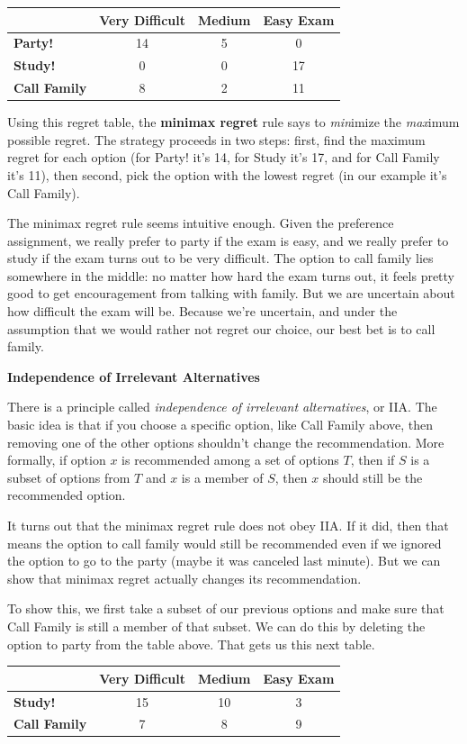 \documentclass[]{tufte-book}
\begin{document}
\begin{longtable}[]{@{}lccc@{}}
\toprule
& Very Difficult & Medium & Easy Exam\tabularnewline
\midrule
\endhead
\textbf{Party!} & 14 & 5 & 0\tabularnewline
\textbf{Study!} & 0 & 0 & 17\tabularnewline
\textbf{Call Family} & 8 & 2 & 11\tabularnewline
\bottomrule
\end{longtable}

Using this regret table, the \textbf{minimax regret} rule says to \emph{min}imize the \emph{max}imum possible regret. The strategy proceeds in two steps: first, find the maximum regret for each option (for Party! it's 14, for Study it's 17, and for Call Family it's 11), then second, pick the option with the lowest regret (in our example it's Call Family).

The minimax regret rule seems intuitive enough. Given the preference assignment, we really prefer to party if the exam is easy, and we really prefer to study if the exam turns out to be very difficult. The option to call family lies somewhere in the middle: no matter how hard the exam turns out, it feels pretty good to get encouragement from talking with family. But we are uncertain about how difficult the exam will be. Because we're uncertain, and under the assumption that we would rather not regret our choice, our best bet is to call family.

\textbf{Independence of Irrelevant Alternatives}

There is a principle called \emph{independence of irrelevant alternatives}, or IIA. The basic idea is that if you choose a specific option, like Call Family above, then removing one of the other options shouldn't change the recommendation. More formally, if option \(x\) is recommended among a set of options \(T\), then if \(S\) is a subset of options from \(T\) and \(x\) is a member of \(S\), then \(x\) should still be the recommended option.

It turns out that the minimax regret rule does not obey IIA. If it did, then that means the option to call family would still be recommended even if we ignored the option to go to the party (maybe it was canceled last minute). But we can show that minimax regret actually changes its recommendation.

To show this, we first take a subset of our previous options and make sure that Call Family is still a member of that subset. We can do this by deleting the option to party from the table above. That gets us this next table.

\begin{longtable}[]{@{}lccc@{}}
\toprule
& Very Difficult & Medium & Easy Exam\tabularnewline
\midrule
\endhead
\textbf{Study!} & 15 & 10 & 3\tabularnewline
\textbf{Call Family} & 7 & 8 & 9\tabularnewline
\bottomrule
\end{longtable}
\end{document}

